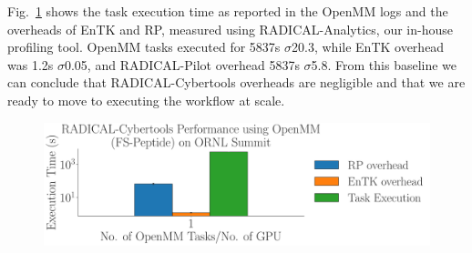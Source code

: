 \documentclass[conference,final]{IEEEtran}
\begin{document}
Fig.~\ref{fig:single_openmm} shows the task execution time as reported in the
OpenMM logs and the overheads of EnTK and RP, measured using
RADICAL-Analytics, our in-house profiling tool. OpenMM tasks executed for
5837s $\sigma$20.3, while EnTK overhead was 1.2s $\sigma$0.05, and
RADICAL-Pilot overhead 5837s $\sigma$5.8. From this baseline we can
conclude that RADICAL-Cybertools overheads are negligible and that we are
ready to move to executing the workflow at scale.

\begin{figure}
    \centering
    \includegraphics[width=.8\textwidth]{single_openmm}
    \caption{}
    \label{fig:single_openmm}
\end{figure}



\end{document}
